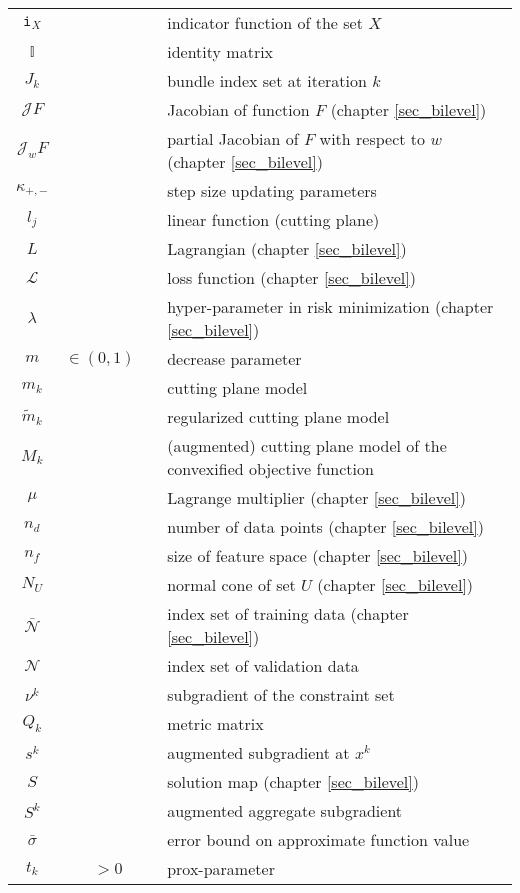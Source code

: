 \begin{longtable}{c@{}c@{} l@{}}
	\(\mathtt{i}_X\) && indicator function of the set \(X\) \\
	\(\mathbb{I}\) && identity matrix \\
	\(J_k\) && bundle index set at iteration \(k\) \\
	\(\mathcal{J}F\) && Jacobian of function \(F\) (chapter \ref{sec_bilevel})\\
	\(\mathcal{J}_wF\) && partial Jacobian of \(F\) with respect to \(w\) (chapter \ref{sec_bilevel})\\
	\(\kappa_{+,-}\) && step size updating parameters \\
	\(l_j\) && linear function (cutting plane) \\
	\(L\) && Lagrangian (chapter \ref{sec_bilevel}) \\
	\(\mathcal{L}\) && loss function (chapter \ref{sec_bilevel}) \\
	\(\lambda\) && hyper-parameter in risk minimization (chapter \ref{sec_bilevel}) \\
	\(m\) &\(\in (0,1) \quad\)& decrease parameter \\
	\(m_k\) && cutting plane model \\
	\(\tilde{m}_k\) && regularized cutting plane model \\
	\(M_k\) && (augmented) cutting plane model of the convexified objective function \\
	\(\mu\) && Lagrange multiplier (chapter \ref{sec_bilevel}) \\
	\(n_d\) && number of data points (chapter \ref{sec_bilevel}) \\
	\(n_f\) && size of feature space (chapter \ref{sec_bilevel}) \\
	\(N_U\) && normal cone of set \(U\) (chapter \ref{sec_bilevel}) \\
	\(\mathcal{\bar{N}}\) && index set of training data (chapter \ref{sec_bilevel}) \\
	\(\mathcal{N}\) && index set of validation data \\
	\(\nu^k\) && subgradient of the constraint set \\
	\(Q_k\) && metric matrix \\
	\(s^k\) && augmented subgradient at \(x^k\) \\
	\(S\) && solution map (chapter \ref{sec_bilevel}) \\
	\(S^k\) && augmented aggregate subgradient \\
	\(\bar{\sigma}\) && error bound on approximate function value \\
	\(t_k\) &\(>0\)& prox-parameter \\

\end{longtable}
